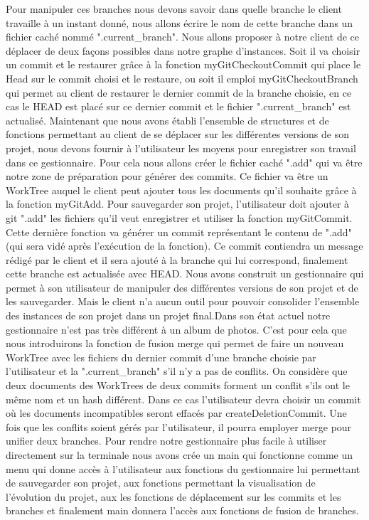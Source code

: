 \documentclass[12pt,francais]{article}
\begin{document}
	Pour manipuler ces branches nous devons savoir dans quelle branche le client travaille à un instant donné, nous allons écrire le nom de cette branche dans un fichier caché nommé  ".current\_branch". Nous allons proposer à notre client de ce déplacer de deux façons possibles dans notre graphe d’instances. Soit il va choisir un commit et le restaurer grâce à la fonction myGitCheckoutCommit qui place le Head sur le commit choisi et le restaure, ou soit il emploi myGitCheckoutBranch qui permet au client de restaurer le dernier commit de la branche choisie, en ce cas le HEAD est placé sur ce dernier commit et le fichier ".current\_branch" est actualisé. \newline \newline
	Maintenant que nous avons établi l’ensemble de structures et de fonctions permettant au client de se déplacer sur les différentes versions de son projet, nous devons fournir à l’utilisateur les moyens pour enregistrer son travail dans ce gestionnaire. Pour cela nous allons créer le fichier caché ".add" qui va être notre zone de préparation pour générer des commits. Ce fichier va être un WorkTree auquel le client peut ajouter tous les documents qu’il souhaite grâce à la fonction myGitAdd.  Pour sauvegarder son projet, l'utilisateur doit ajouter à git ".add" les fichiers qu'il veut enregistrer et utiliser la fonction myGitCommit. Cette dernière fonction va générer un commit représentant le contenu de ".add" (qui sera vidé après l’exécution de la fonction). Ce commit contiendra un message rédigé par le client et il sera ajouté à la branche qui lui correspond, finalement cette branche est actualisée avec HEAD.\newline \newline
	Nous avons construit un gestionnaire qui permet à son utilisateur de manipuler des différentes versions de son projet et de les sauvegarder. Mais le client n'a aucun outil pour pouvoir consolider  l'ensemble des instances de son projet dans un projet final.Dans son état actuel notre gestionnaire n’est pas très différent à un album de photos. C’est pour cela que nous introduirons la fonction de fusion merge qui permet de faire un nouveau WorkTree avec les fichiers du dernier commit d’une branche choisie par l’utilisateur et la ".current\_branch" s’il n’y a pas de conflits. On considère que deux documents des WorkTrees de deux commits forment un conflit s’ils ont le même nom et un hash différent. Dans ce cas l’utilisateur devra choisir un commit  où les documents incompatibles seront effacés par createDeletionCommit. Une fois que les conflits soient gérés par l’utilisateur, il pourra employer merge pour unifier deux branches.
	Pour rendre notre gestionnaire plus facile à utiliser directement sur la terminale nous avons crée un main qui fonctionne comme un menu qui donne accès à l’utilisateur aux fonctions du gestionnaire lui permettant de sauvegarder son projet, aux fonctions permettant la  visualisation de l’évolution du projet, aux les fonctions de déplacement sur les commits et les branches et finalement main donnera l’accès aux fonctions de fusion de branches. 	
\end{document}
